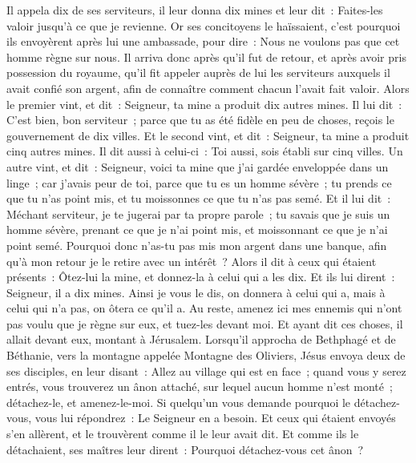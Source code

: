 \begin{multicols}{2}
Il appela dix de ses serviteurs, il leur donna dix mines et leur dit~: Faites-les valoir jusqu'à ce que je revienne.
Or ses concitoyens le haïssaient, c'est pourquoi ils envoyèrent après lui une ambassade, pour dire~: Nous ne voulons pas que cet homme règne sur nous.
 Il arriva donc après qu'il fut de retour, et après avoir pris possession du royaume, qu'il fit appeler auprès de lui les serviteurs auxquels il avait confié son argent, afin de connaître comment chacun l'avait fait valoir.
Alors le premier vint, et dit~: Seigneur, ta mine a produit dix autres mines.
Il lui dit~: C'est bien, bon serviteur~; parce que tu as été fidèle en peu de choses, reçois le gouvernement de dix villes.
Et le second vint, et dit~: Seigneur, ta mine a produit cinq autres mines.
Il dit aussi à celui-ci~: Toi aussi, sois établi sur cinq villes.
Un autre vint, et dit~: Seigneur, voici ta mine que j'ai gardée enveloppée dans un linge~;
car j'avais peur de toi, parce que tu es un homme sévère~; tu prends ce que tu n'as point mis, et tu moissonnes ce que tu n'as pas semé.
Et il lui dit~: Méchant serviteur, je te jugerai par ta propre parole~; tu savais que je suis un homme sévère, prenant ce que je n'ai point mis, et moissonnant ce que je n'ai point semé.
Pourquoi donc n'as-tu pas mis mon argent dans une banque, afin qu'à mon retour je le retire avec un intérêt~?
Alors il dit à ceux qui étaient présents~: Ôtez-lui la mine, et donnez-la à celui qui a les dix.
Et ils lui dirent~: Seigneur, il a dix mines.
Ainsi je vous le dis, on donnera à celui qui a, mais à celui qui n'a pas, on ôtera ce qu'il a.
Au reste, amenez ici mes ennemis qui n'ont pas voulu que je règne sur eux, et tuez-les devant moi.
Et ayant dit ces choses, il allait devant eux, montant à Jérusalem.
Lorsqu'il approcha de Bethphagé et de Béthanie, vers la montagne appelée Montagne des Oliviers, Jésus envoya deux de ses disciples,
en leur disant~: Allez au village qui est en face~; quand vous y serez entrés, vous trouverez un ânon attaché, sur lequel aucun homme n'est monté~; détachez-le, et amenez-le-moi.
Si quelqu'un vous demande pourquoi le détachez-vous, vous lui répondrez~: Le Seigneur en a besoin.
Et ceux qui étaient envoyés s'en allèrent, et le trouvèrent comme il le leur avait dit.
Et comme ils le détachaient, ses maîtres leur dirent~: Pourquoi détachez-vous cet ânon~?

\end{multicols}
